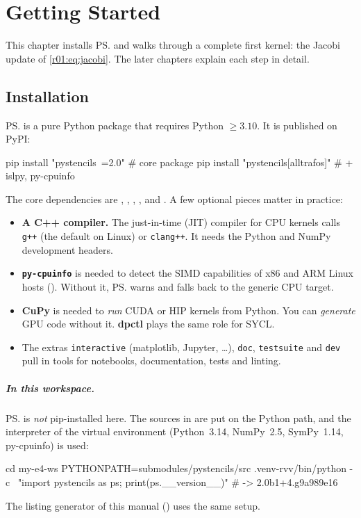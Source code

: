 \chapter{Getting Started}\label{r01:ch:getting-started}

This chapter installs \ps{} and walks through a complete first kernel: the Jacobi update
of \cref{r01:eq:jacobi}. The later chapters explain each step in detail.

\section{Installation}

\ps{} is a pure Python package that requires Python $\geq 3.10$. It is published on PyPI:
\begin{shcode}
pip install "pystencils~=2.0"            # core package
pip install "pystencils[alltrafos]"      # + islpy, py-cpuinfo
\end{shcode}
The core dependencies are , , ,
,  and . A few optional pieces matter in
practice:
\begin{itemize}
  \item \textbf{A C++ compiler.} The just-in-time (JIT) compiler for CPU kernels calls
        \texttt{g++} (the default on Linux) or \texttt{clang++}. It needs the Python and
        NumPy development headers.
  \item \textbf{\texttt{py-cpuinfo}} is needed to detect the SIMD capabilities of x86
        and ARM Linux hosts (). Without it, \ps{} warns and falls
        back to the generic CPU target.
  \item \textbf{CuPy} is needed to \emph{run} CUDA or HIP kernels from Python. You
        can \emph{generate} GPU code without it. \textbf{dpctl} plays the same role
        for SYCL.
  \item The extras \texttt{interactive} (matplotlib, Jupyter, \dots), \texttt{doc},
        \texttt{testsuite} and \texttt{dev} pull in tools for notebooks, documentation,
        tests and linting.
\end{itemize}

\paragraph{In this workspace.}
\ps{} is \emph{not} pip-installed here. The sources in 
are put on the Python path, and the interpreter of the virtual environment
 (Python~3.14, NumPy~2.5, SymPy~1.14, py-cpuinfo) is used:
\begin{shcode}
cd my-e4-ws
PYTHONPATH=submodules/pystencils/src .venv-rvv/bin/python -c \
    "import pystencils as ps; print(ps.__version__)"     # -> 2.0b1+4.g9a989e16
\end{shcode}
The listing generator of this manual () uses the same setup.

